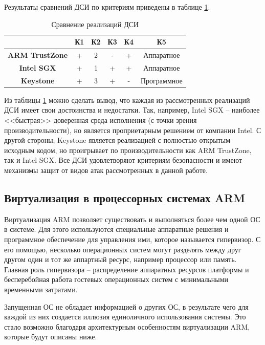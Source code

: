 Результаты сравнений ДСИ по критериям приведены в таблице \ref{table:comparsion}.

\begin{table}[!htb]
	\begin{center}
		\caption{Сравнение реализаций ДСИ}
		\label{table:comparsion}
		\begin{tabular}{|c|c|c|c|c|c|}
			\hline
			 & \bfseries К1 & \bfseries К2 & \bfseries К3 & \bfseries К4 & \bfseries К5 \\
			\hline
			\bfseries ARM TrustZone & + & 2 & - & + & Аппаратное \\ \hline
			\bfseries Intel SGX & + & 1 & + & + & Аппаратное\\ \hline
			\bfseries Keystone & + & 3 & + & - & Программное\\ \hline
		\end{tabular}
	\end{center}
\end{table}

Из таблицы \ref{table:comparsion} можно сделать вывод, что каждая из рассмотренных реализаций ДСИ имеет свои достоинства и недостатки. Так, например, Intel SGX -- наиболее <<быстрая>> доверенная среда исполнения (с точки зрения производительности), но является проприетарным решением от компании Intel. С другой стороны, Keystone является реализацией с полностью открытым исходным кодом, но проигрывает по производительности как ARM TrustZone, так и Intel SGX. Все ДСИ удовлетворяют критериям безопасности и имеют механизмы защит от видов атак рассмотренных в данной работе.

\subsection{Виртуализация в процессорных системах ARM}

Виртуализация ARM позволяет существовать и выполняться более чем одной ОС в системе. Для этого используются специальные аппаратные решения и программное обеспечение для управления ими, которое называется гипервизор. С его помощью, несколько операционных систем могут разделять между друг другом один и тот же аппартный ресурс, например процессор или память. Главная роль гипервизора -- распределение аппаратных ресурсов платформы и бесперебойная работа гостевых операционных систем с минимальными временными затратами.

Запущенная ОС не обладает информацией о других ОС, в результате чего для каждой из них создается иллюзия единоличного использования системы. Это стало возможно благодаря архитектурным особенностям виртуализации ARM, которые будут описаны ниже.

